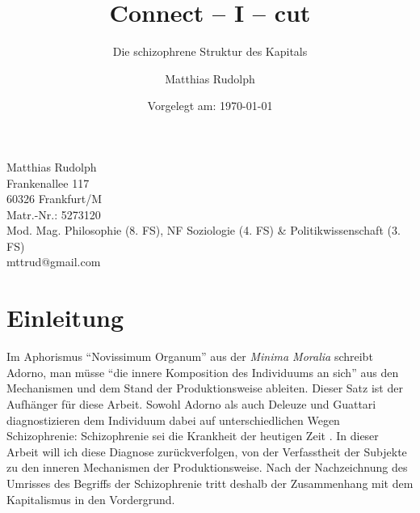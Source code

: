 \documentclass[12pt,
               paper=a4,
               twoside=false,
               onehalfspacing,
               bibliography=totoc,
               toc=graduated,
               ]{scrartcl}
\newcommand{\pc}[2]{\parencite[#1]{#2}}
\newcommand{\dg}{Deleuze und Guattari\xspace}
\begin{document}
\setcounter{page}{0}

\titlehead{Goethe-Universität Frankfurt am Main\\
Fachbereich Philosophie und Geschichtswissenschaften\\
Institut für Philosophie\\
Prof. Dr. Christoph Menke\\
Seminar: Demokratie und Kapitalismus\\
SoSe 2013\\
Modul: Mod. Mag. VM 3b}
\title{Connect -- I -- cut}
\subtitle{Die schizophrene Struktur des Kapitals}
\author{Matthias Rudolph}
\date{Vorgelegt am: \today}

\maketitle
\vfill

\noindent Matthias Rudolph\\
Frankenallee 117\\
60326 Frankfurt/M\\
Matr.-Nr.: 5273120\\
Mod. Mag. Philosophie (8. FS), NF Soziologie (4. FS) \& Politikwissenschaft (3. FS)\\ %
mttrud@gmail.com
\newpage

\tableofcontents
\newpage


\section{Einleitung}

%
%

Im Aphorismus "`Novissimum Organum"' aus der \emph{Minima Moralia}
schreibt Adorno, man müsse "`die innere Komposition des Individuums an
sich"' \pc{261}{min} aus den Mechanismen und dem Stand der
Produktionsweise ableiten. Dieser Satz ist der Aufhänger für diese
Arbeit. Sowohl Adorno als auch \dg diagnostizieren dem Individuum
dabei auf unterschiedlichen Wegen Schizophrenie: Schizophrenie sei die
Krankheit der heutigen Zeit \parencites[vgl.][263]{min}[28]{schizg}.
In dieser Arbeit will ich diese Diagnose zurückverfolgen, von der
Verfasstheit der Subjekte zu den inneren Mechanismen der
Produktionsweise. Nach der Nachzeichnung des Umrisses des Begriffs der
Schizophrenie tritt deshalb der Zusammenhang mit dem Kapitalismus in
den Vordergrund.
\end{document}
